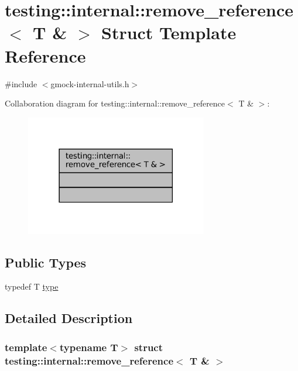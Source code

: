 \hypertarget{structtesting_1_1internal_1_1remove__reference_3_01T_01_6_01_4}{}\section{testing\+:\+:internal\+:\+:remove\+\_\+reference$<$ T \& $>$ Struct Template Reference}
\label{structtesting_1_1internal_1_1remove__reference_3_01T_01_6_01_4}


{\ttfamily \#include $<$gmock-\/internal-\/utils.\+h$>$}



Collaboration diagram for testing\+:\+:internal\+:\+:remove\+\_\+reference$<$ T \& $>$\+:
\nopagebreak
\begin{figure}[H]
\begin{center}
\leavevmode
\includegraphics[width=225pt]{structtesting_1_1internal_1_1remove__reference_3_01T_01_6_01_4__coll__graph}
\end{center}
\end{figure}
\subsection*{Public Types}
\begin{DoxyCompactItemize}
\item 
typedef T \hyperlink{structtesting_1_1internal_1_1remove__reference_3_01T_01_6_01_4_a0d72f004f54016a47c752a82be352a19}{type}
\end{DoxyCompactItemize}


\subsection{Detailed Description}
\subsubsection*{template$<$typename T$>$\newline
struct testing\+::internal\+::remove\+\_\+reference$<$ T \& $>$}



